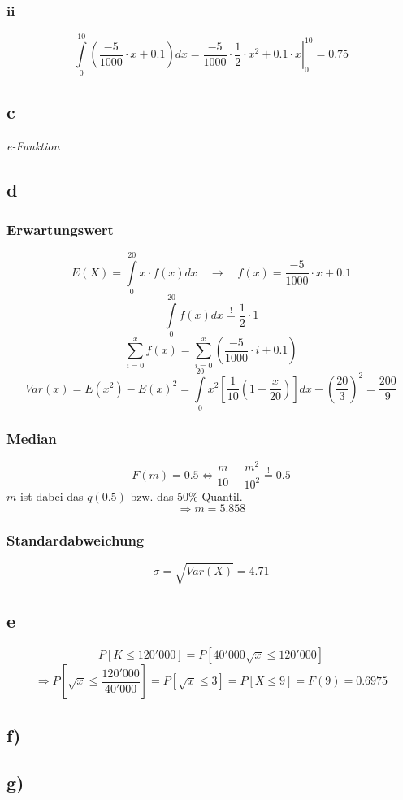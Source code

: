 \subsubsection*{ii}
\[ \int\limits_0^{10}\left( \frac{-5}{1000} \cdot x + 0.1 \right)dx =
   \left. 
   	\frac{-5}{1000} \cdot \frac{1}{2} \cdot x^2 + 0.1 \cdot x 
   \right|_0^{10} = 0.75 \]

\subsection*{c}
\emph{e-Funktion}

\subsection*{d}
\subsubsection*{Erwartungswert}
\[ E(X) = \int\limits_0^{20} x \cdot f(x) dx \quad \rightarrow \quad
   f(x) = \frac{-5}{1000} \cdot x + 0.1 \]
\[ \int\limits_0^{20} f(x) dx \stackrel{!}{=} \frac{1}{2} \cdot 1  \]
\[ \sum\limits_{i=0}^{x} f(x) = 
   \sum\limits_{i=0}^{x} \left( \frac{-5}{1000} \cdot i + 0.1 \right) \]
\[ Var(x) = E(x^2) - E(x)^2 = 
\int\limits_0^{20} x^2 
\left[ \frac{1}{10}\left(1-\frac{x}{20} \right) \right]dx 
- \left( \frac{20}{3} \right)^2
= \frac{200}{9}\]
\subsubsection*{Median}
\[ F(m) = 0.5 \Leftrightarrow \frac{m}{10} - 
   \frac{m^2}{10^2} \stackrel{!}{=} 0.5 \]
$m$ ist dabei das $q(0.5)$ bzw. das 50\% Quantil.
\[ \Rightarrow m = 5.858 \]
\subsubsection*{Standardabweichung}
\[ \sigma = \sqrt{Var(X)} = 4.71 \]

\subsection*{e}
\[ P\left[K \leq 120'000\right] =
   P\left[40'000\sqrt{x} \leq 120'000\right] \]
\[ \Rightarrow P\left[\sqrt{x}\leq\frac{120'000}{40'000}\right] =
   P\left[\sqrt{x}\leq3\right] =
   P\left[X \leq 9\right] =
   F(9) = 0.6975\]

\subsection*{f)}

\subsection*{g)}
